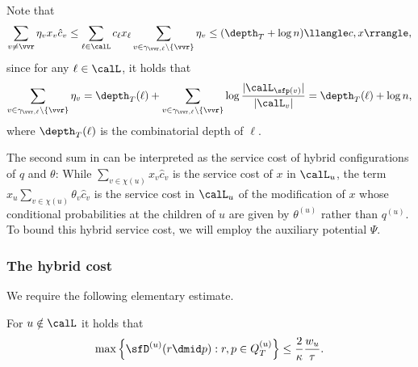 Note that
\begin{align}\label{eq:mv2}
\sum_{v \neq \vvr} \eta_v x_v \hat{c}_v \leq \sum_{\ell \in \calL} c_{\ell} x_{\ell} \sum_{v \in \gamma_{\vvr,\ell} \setminus \{\vvr\}} \eta_v
\leq (\depth_T + \log n) \llangle c,x\rrangle,
\end{align}
since for any $\ell \in \calL$, it holds that
\begin{align*}
\sum_{v \in \gamma_{\vvr,\ell} \setminus \{\vvr\}} \eta_v = \depth_T(\ell) + \sum_{v \in \gamma_{\vvr,\ell} \setminus \{\vvr\}} \log \frac{|\calL_{\sfp(v)}|}{|\calL_v|} =
\depth_T(\ell) + \log n,
\end{align*}
where $\depth_T(\ell)$ is the combinatorial depth of $\ell$.

The second sum in  can be interpreted as the service cost of hybrid configurations of $q$ and $\theta$: While $\sum_{v\in\chi(u)}x_v\hat{c}_v$ is the service cost of $x$ in $\calL_u$, the term $x_u\sum_{v\in\chi(u)}\theta_v\hat{c}_v$ is the service cost in $\calL_u$ of the modification of $x$ whose conditional probabilities at the children of $u$ are given by $\theta^{(u)}$ rather than $q^{(u)}$. To bound this hybrid service cost, we will employ the auxiliary potential $\Psi$.


\subsubsection{The hybrid cost}
\label{sec:hybrid}

We require the following elementary estimate.

\begin{lemma}\label{lem:dmax}
	For $u \notin \calL$ it holds that
	\begin{equation*}\label{eq:dmax}
	\max \left\{ \sfD^{(u)}(r \dmid p) : r,p \in Q^{(u)}_T \right\} \leq \frac{2}{\kappa} \frac{w_u}{\tau}.
	\end{equation*}
\end{lemma}

